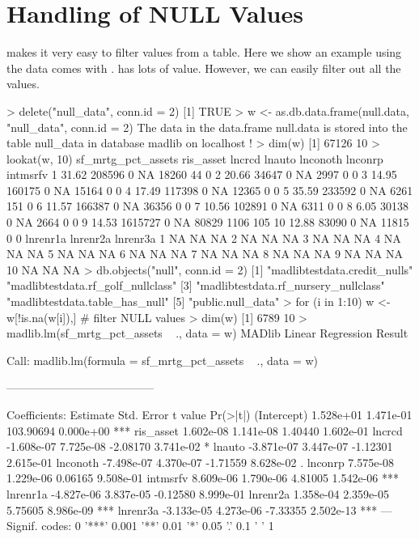 \section{Handling of NULL Values}

 makes it very easy to filter  values from a
table. Here we show an example using the data  comes
with .  has lots of  value.
However, we can easily
filter out all the  values.

\begin{example}
> delete("null_data", conn.id = 2)
[1] TRUE
> w <- as.db.data.frame(null.data, "null_data", conn.id = 2)
The data in the data.frame null.data is stored into the table null_data in database madlib on localhost !
> dim(w)
[1] 67126    10
> lookat(w, 10)
   sf_mrtg_pct_assets ris_asset lncrcd lnauto lnconoth lnconrp intmsrfv
1               31.62    208596      0     NA    18260      44        0
2               20.66     34647      0     NA     2997       0        0
3               14.95    160175      0     NA    15164       0        0
4               17.49    117398      0     NA    12365       0        0
5               35.59    233592      0     NA     6261     151        0
6               11.57    166387      0     NA    36356       0        0
7               10.56    102891      0     NA     6311       0        0
8                6.05     30138      0     NA     2664       0        0
9               14.53   1615727      0     NA    80829    1106      105
10              12.88     83090      0     NA    11815       0        0
   lnrenr1a lnrenr2a lnrenr3a
1        NA       NA       NA
2        NA       NA       NA
3        NA       NA       NA
4        NA       NA       NA
5        NA       NA       NA
6        NA       NA       NA
7        NA       NA       NA
8        NA       NA       NA
9        NA       NA       NA
10       NA       NA       NA
> db.objects("null", conn.id = 2)
[1] "madlibtestdata.credit_nulls"         "madlibtestdata.rf_golf_nullclass"
[3] "madlibtestdata.rf_nursery_nullclass" "madlibtestdata.table_has_null"
[5] "public.null_data"
> for (i in 1:10) w <- w[!is.na(w[i]),] # filter NULL values
> dim(w)
[1] 6789   10
> madlib.lm(sf_mrtg_pct_assets ~ ., data = w)
MADlib Linear Regression Result

Call:
madlib.lm(formula = sf_mrtg_pct_assets ~ ., data = w)

---------------------------------------

Coefficients:
              Estimate Std. Error   t value      Pr(>|t|)
(Intercept)  1.528e+01  1.471e-01 103.90694 0.000e+00 ***
ris_asset    1.602e-08  1.141e-08   1.40440 1.602e-01
lncrcd      -1.608e-07  7.725e-08  -2.08170 3.741e-02 *
lnauto      -3.871e-07  3.447e-07  -1.12301 2.615e-01
lnconoth    -7.498e-07  4.370e-07  -1.71559 8.628e-02 .
lnconrp      7.575e-08  1.229e-06   0.06165 9.508e-01
intmsrfv     8.609e-06  1.790e-06   4.81005 1.542e-06 ***
lnrenr1a    -4.827e-06  3.837e-05  -0.12580 8.999e-01
lnrenr2a     1.358e-04  2.359e-05   5.75605 8.986e-09 ***
lnrenr3a    -3.133e-05  4.273e-06  -7.33355 2.502e-13 ***
---
Signif. codes:  0 '***' 0.001 '**' 0.01 '*' 0.05 '.' 0.1 ' ' 1


\end{example}
